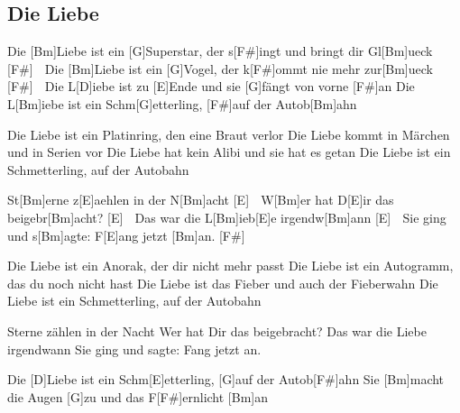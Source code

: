 \subsection*{Die Liebe   }
\begin{guitar}

Die [Bm]Liebe ist ein [G]Superstar,
der s[F#]ingt und bringt dir Gl[Bm]ueck [F#] $\;$
Die [Bm]Liebe ist ein [G]Vogel,
der k[F#]ommt nie mehr zur[Bm]ueck [F#] $\;$
Die L[D]iebe ist zu [E]Ende
und sie [G]fängt von vorne [F#]an
Die L[Bm]iebe ist ein Schm[G]etterling,
[F#]auf der Autob[Bm]ahn



Die Liebe ist ein Platinring,
den eine Braut verlor
Die Liebe kommt in Märchen
und in Serien vor
Die Liebe hat kein Alibi
und sie hat es getan
Die Liebe ist ein Schmetterling,
auf der Autobahn



St[Bm]erne z[E]aehlen in der N[Bm]acht [E] $\;$
W[Bm]er hat D[E]ir das beigebr[Bm]acht? [E] $\;$
Das war die L[Bm]ieb[E]e irgendw[Bm]ann [E] $\;$
Sie ging und s[Bm]agte: F[E]ang jetzt [Bm]an. [F#] $\;$



Die Liebe ist ein Anorak,
der dir nicht mehr passt
Die Liebe ist ein Autogramm,
das du noch nicht hast
Die Liebe ist das Fieber
und auch der Fieberwahn
Die Liebe ist ein Schmetterling,
auf der Autobahn


Sterne zählen in der Nacht
Wer hat Dir das beigebracht?
Das war die Liebe irgendwann
Sie ging und sagte: Fang jetzt an.



Die [D]Liebe ist ein Schm[E]etterling,
[G]auf der Autob[F#]ahn
Sie [Bm]macht die Augen [G]zu
und das F[F#]ernlicht [Bm]an
\end{guitar}
